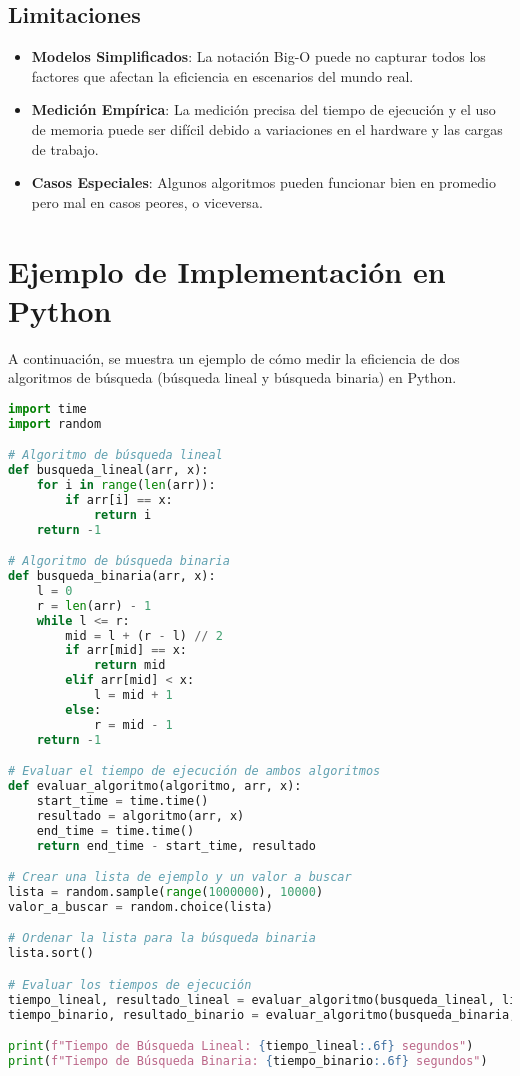 \documentclass{article}
\begin{document}
\subsection*{Limitaciones}
\begin{itemize}
    \item \textbf{Modelos Simplificados}: La notación Big-O puede no capturar todos los factores que afectan la eficiencia en escenarios del mundo real.
    \item \textbf{Medición Empírica}: La medición precisa del tiempo de ejecución y el uso de memoria puede ser difícil debido a variaciones en el hardware y las cargas de trabajo.
    \item \textbf{Casos Especiales}: Algunos algoritmos pueden funcionar bien en promedio pero mal en casos peores, o viceversa.
\end{itemize}

\section*{Ejemplo de Implementación en Python}
A continuación, se muestra un ejemplo de cómo medir la eficiencia de dos algoritmos de búsqueda (búsqueda lineal y búsqueda binaria) en Python.

\begin{lstlisting}[language=Python, basicstyle=\ttfamily\footnotesize]
import time
import random

# Algoritmo de búsqueda lineal
def busqueda_lineal(arr, x):
    for i in range(len(arr)):
        if arr[i] == x:
            return i
    return -1

# Algoritmo de búsqueda binaria
def busqueda_binaria(arr, x):
    l = 0
    r = len(arr) - 1
    while l <= r:
        mid = l + (r - l) // 2
        if arr[mid] == x:
            return mid
        elif arr[mid] < x:
            l = mid + 1
        else:
            r = mid - 1
    return -1

# Evaluar el tiempo de ejecución de ambos algoritmos
def evaluar_algoritmo(algoritmo, arr, x):
    start_time = time.time()
    resultado = algoritmo(arr, x)
    end_time = time.time()
    return end_time - start_time, resultado

# Crear una lista de ejemplo y un valor a buscar
lista = random.sample(range(1000000), 10000)
valor_a_buscar = random.choice(lista)

# Ordenar la lista para la búsqueda binaria
lista.sort()

# Evaluar los tiempos de ejecución
tiempo_lineal, resultado_lineal = evaluar_algoritmo(busqueda_lineal, lista, valor_a_buscar)
tiempo_binario, resultado_binario = evaluar_algoritmo(busqueda_binaria, lista, valor_a_buscar)

print(f"Tiempo de Búsqueda Lineal: {tiempo_lineal:.6f} segundos")
print(f"Tiempo de Búsqueda Binaria: {tiempo_binario:.6f} segundos")
\end{lstlisting}
\end{document}
